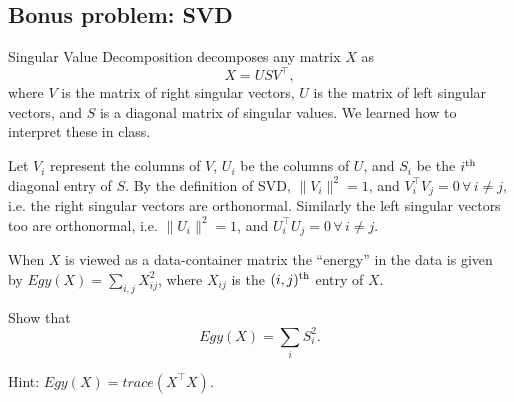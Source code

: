 \subsection{Bonus problem: SVD}

Singular Value Decomposition decomposes any matrix $X$ as 
\[
X = U S V^\top,
\]
where $V$ is the matrix of right singular vectors, $U$ is the matrix of left singular vectors, and $S$ is a diagonal matrix of singular values.  We learned how to interpret these in class.

Let $V_i$ represent the columns of $V$, $U_i$ be the columns of $U$, and $S_i$ be the $i^{\rm th}$ diagonal entry of $S$. By the definition of SVD, $\|V_i\|^2 = 1$, and $V_i^\top V_j = 0\,\forall \,i\neq j$, i.e. the right singular vectors are orthonormal.  Similarly the left singular vectors too are orthonormal, i.e.  $\|U_i\|^2 = 1$, and $U_i^\top U_j = 0\,\forall \,i\neq j$. 

When $X$ is viewed as a data-container matrix the ``energy'' in the data is given by $Egy(X) = \sum_{i,j}X_{ij}^2$, where $X_{ij}$ is the $(i,j)^{\rm th}$ entry of $X$.

Show that 
\[
Egy(X) = \sum_{i} S_i^2.
\]

Hint: $Egy(X) = trace(X^\top X).$